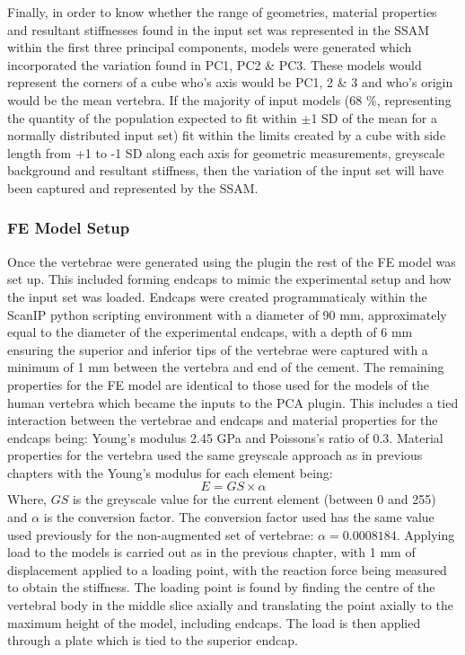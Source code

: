 Finally, in order to know whether the range of geometries, material properties
and resultant stiffnesses found in the input set was represented in the SSAM
within the first three principal components, models were generated which
incorporated the variation found in PC1, PC2 \& PC3.  These models would
represent the corners of a cube who's axis would be PC1, 2 \& 3 and who's
origin would be the mean vertebra.  If the majority of input models (68 \%,
representing the quantity of the population expected to fit within $\pm$1 SD of
the mean for a normally distributed input set) fit within the limits created by
a cube with side length from +1 to -1 SD along each axis for geometric
measurements, greyscale background and resultant stiffness, then the variation
of the input set will have been captured and represented by the SSAM.

\subsubsection{FE Model Setup}

Once the vertebrae were generated using the plugin the rest of the FE model was
set up.  This included forming endcaps to mimic the experimental setup and how
the input set was loaded.  Endcaps were created programmaticaly within the
ScanIP python scripting environment with a diameter of 90 mm, approximately
equal to the diameter of the experimental endcaps, with a depth of 6 mm
ensuring the superior and inferior tips of the vertebrae were captured with a
minimum of 1 mm between the vertebra and end of the cement.  The remaining
properties for the FE model are identical to those used for the models of the
human vertebra which became the inputs to the PCA plugin.  This includes a tied
interaction between the vertebrae and endcaps and material properties for the
endcaps being: Young's modulus 2.45 GPa and Poissons's ratio of 0.3.  Material
properties for the vertebra used the same greyscale approach as in previous
chapters with the Young's modulus for each element being: \[ E = GS \times
\alpha \] Where, $GS$ is the greyscale value for the current element (between 0
and 255) and $\alpha$ is the conversion factor.  The conversion factor used has
the same value used previously for the non-augmented set of vertebrae: $\alpha
= 0.0008184$.  Applying load to the models is carried out as in the previous
chapter, with 1 mm of displacement applied to a loading point, with the
reaction force being measured to obtain the stiffness.  The loading point is
found by finding the centre of the vertebral body in the middle slice axially
and translating the point axially to the maximum height of the model, including
endcaps.  The load is then applied through a plate which is tied to the
superior endcap.

